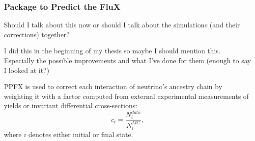 \fi


\subsubsection{Package to Predict the FluX}
Should I talk about this now or should I talk about the simulations (and their corrections) together? 

I did this in the beginning of my thesis so maybe I should mention this. Especially the possible improvements and what I've done for them (enough to say I looked at it?)


\iffalse
PPFX is used to correct each interaction of neutrino's ancestry chain by weighting it with a factor computed from external experimental measurements of yields or invariant differential cross-sections: \cite{LEOFluxPredictionAtNuMI.pdf}
\begin{equation}
c_{i}=\frac{N^{data}_{i}}{N^{MC}_{i}},
\end{equation}
where $i$ denotes either initial or final state.

